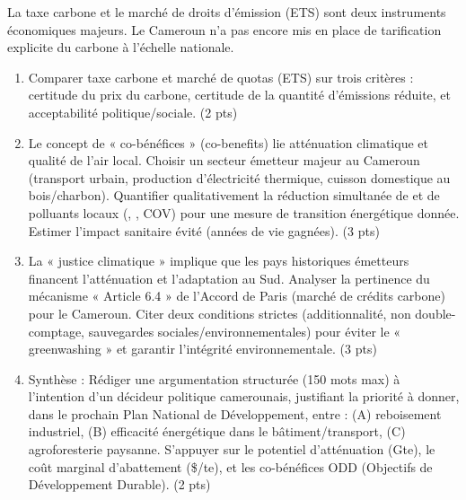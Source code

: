 \documentclass[11pt]{article}
\begin{document}
\begin{exercice}
La taxe carbone et le marché de droits d'émission (ETS) sont deux instruments économiques majeurs. Le Cameroun n'a pas encore mis en place de tarification explicite du carbone à l'échelle nationale.

\begin{enumerate}
    \item Comparer taxe carbone et marché de quotas (ETS) sur trois critères : certitude du prix du carbone, certitude de la quantité d'émissions réduite, et acceptabilité politique/sociale. (2 pts)
    \item Le concept de « co-bénéfices » (co-benefits) lie atténuation climatique et qualité de l'air local. Choisir un secteur émetteur majeur au Cameroun (transport urbain, production d'électricité thermique, cuisson domestique au bois/charbon). Quantifier qualitativement la réduction simultanée de  et de polluants locaux (, , COV) pour une mesure de transition énergétique donnée. Estimer l'impact sanitaire évité (années de vie gagnées). (3 pts)
    \item La « justice climatique » implique que les pays historiques émetteurs financent l'atténuation et l'adaptation au Sud. Analyser la pertinence du mécanisme « Article 6.4 » de l'Accord de Paris (marché de crédits carbone) pour le Cameroun. Citer deux conditions strictes (additionnalité, non double-comptage, sauvegardes sociales/environnementales) pour éviter le « greenwashing » et garantir l'intégrité environnementale. (3 pts)
    \item Synthèse : Rédiger une argumentation structurée (150 mots max) à l'intention d'un décideur politique camerounais, justifiant la priorité à donner, dans le prochain Plan National de Développement, entre : (A) reboisement industriel, (B) efficacité énergétique dans le bâtiment/transport, (C) agroforesterie paysanne. S'appuyer sur le potentiel d'atténuation (Gte), le coût marginal d'abattement (\$/te), et les co-bénéfices ODD (Objectifs de Développement Durable). (2 pts)
\end{enumerate}
\end{exercice}
\end{document}
